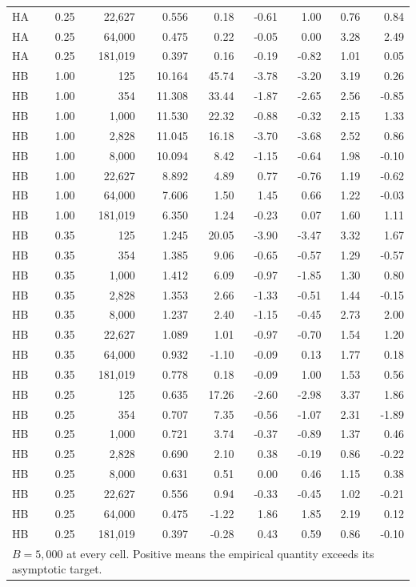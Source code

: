 \begin{tabular}{lrrrrrrrr}
HA & 0.25 & 22,627 & 0.556 & 0.18 & -0.61 & 1.00 & 0.76 & 0.84 \\
HA & 0.25 & 64,000 & 0.475 & 0.22 & -0.05 & 0.00 & 3.28 & 2.49 \\
HA & 0.25 & 181,019 & 0.397 & 0.16 & -0.19 & -0.82 & 1.01 & 0.05 \\
HB & 1.00 & 125 & 10.164 & 45.74 & -3.78 & -3.20 & 3.19 & 0.26 \\
HB & 1.00 & 354 & 11.308 & 33.44 & -1.87 & -2.65 & 2.56 & -0.85 \\
HB & 1.00 & 1,000 & 11.530 & 22.32 & -0.88 & -0.32 & 2.15 & 1.33 \\
HB & 1.00 & 2,828 & 11.045 & 16.18 & -3.70 & -3.68 & 2.52 & 0.86 \\
HB & 1.00 & 8,000 & 10.094 & 8.42 & -1.15 & -0.64 & 1.98 & -0.10 \\
HB & 1.00 & 22,627 & 8.892 & 4.89 & 0.77 & -0.76 & 1.19 & -0.62 \\
HB & 1.00 & 64,000 & 7.606 & 1.50 & 1.45 & 0.66 & 1.22 & -0.03 \\
HB & 1.00 & 181,019 & 6.350 & 1.24 & -0.23 & 0.07 & 1.60 & 1.11 \\
HB & 0.35 & 125 & 1.245 & 20.05 & -3.90 & -3.47 & 3.32 & 1.67 \\
HB & 0.35 & 354 & 1.385 & 9.06 & -0.65 & -0.57 & 1.29 & -0.57 \\
HB & 0.35 & 1,000 & 1.412 & 6.09 & -0.97 & -1.85 & 1.30 & 0.80 \\
HB & 0.35 & 2,828 & 1.353 & 2.66 & -1.33 & -0.51 & 1.44 & -0.15 \\
HB & 0.35 & 8,000 & 1.237 & 2.40 & -1.15 & -0.45 & 2.73 & 2.00 \\
HB & 0.35 & 22,627 & 1.089 & 1.01 & -0.97 & -0.70 & 1.54 & 1.20 \\
HB & 0.35 & 64,000 & 0.932 & -1.10 & -0.09 & 0.13 & 1.77 & 0.18 \\
HB & 0.35 & 181,019 & 0.778 & 0.18 & -0.09 & 1.00 & 1.53 & 0.56 \\
HB & 0.25 & 125 & 0.635 & 17.26 & -2.60 & -2.98 & 3.37 & 1.86 \\
HB & 0.25 & 354 & 0.707 & 7.35 & -0.56 & -1.07 & 2.31 & -1.89 \\
HB & 0.25 & 1,000 & 0.721 & 3.74 & -0.37 & -0.89 & 1.37 & 0.46 \\
HB & 0.25 & 2,828 & 0.690 & 2.10 & 0.38 & -0.19 & 0.86 & -0.22 \\
HB & 0.25 & 8,000 & 0.631 & 0.51 & 0.00 & 0.46 & 1.15 & 0.38 \\
HB & 0.25 & 22,627 & 0.556 & 0.94 & -0.33 & -0.45 & 1.02 & -0.21 \\
HB & 0.25 & 64,000 & 0.475 & -1.22 & 1.86 & 1.85 & 2.19 & 0.12 \\
HB & 0.25 & 181,019 & 0.397 & -0.28 & 0.43 & 0.59 & 0.86 & -0.10 \\
\midrule
\multicolumn{9}{l}{$B=5,000$ at every cell. Positive means the empirical quantity exceeds its asymptotic target.} \\
\bottomrule
\end{tabular}
